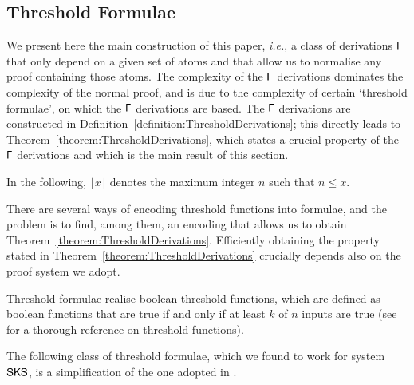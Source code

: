 \subsection{Threshold Formulae}\label{subsubsection:ThresholdFormulae}


We present here the main construction of this paper, \emph{i.e.}, a class of derivations $\mathsf\Gamma$ that only depend on a given set of atoms and that allow us to normalise any proof containing those atoms. The complexity of the $\mathsf\Gamma$ derivations dominates the complexity of the normal proof, and is due to the complexity of certain `threshold formulae', on which the $\mathsf\Gamma$ derivations are based. The $\mathsf\Gamma$ derivations are constructed in Definition~\vref{definition:ThresholdDerivations}; this directly leads to Theorem~\vref{theorem:ThresholdDerivations}, which states a crucial property of the $\mathsf\Gamma$ derivations and which is the main result of this section.

In the following, $\lfloor x\rfloor$ denotes the maximum integer $n$ such that $n\le x$.


There are several ways of encoding threshold functions into formulae, and the problem is to find, among them, an encoding that allows us to obtain Theorem~\vref{theorem:ThresholdDerivations}. Efficiently obtaining the property stated in Theorem~\vref{theorem:ThresholdDerivations} crucially depends also on the proof system we adopt.

Threshold formulae realise boolean threshold functions, which are defined as boolean functions that are true if and only if at least $k$ of $n$ inputs are true (see \cite{Wege:87:The-Comp:vn} for a thorough reference on threshold functions). 

The following class of threshold formulae, which we found to work for system $\mathsf{SKS}$, is a simplification of the one adopted in \cite{AtseGalePudl:02:Monotone:yu}.

